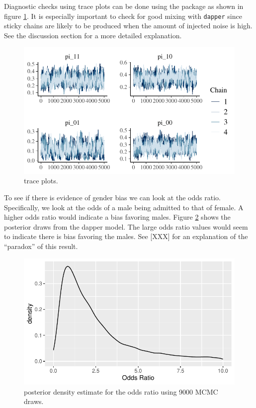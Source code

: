 Diagnostic checks using trace plots can be done using the  package
as shown in figure \ref{fig:trace-plot}. It is especially important to check for good mixing
with \texttt{dapper} since sticky chains are likely to be produced
when the amount of injected noise is high. See the discussion section
for a more detailed explanation.

\begin{figure}

{\centering \includegraphics{dppaper_files/figure-latex/trace-plot-1} 

}

\caption{trace plots.}\label{fig:trace-plot}
\end{figure}

To see if there is evidence of gender bias we can look at the odds ratio.
Specifically, we look at the odds of a male being admitted to
that of female. A higher odds ratio would indicate a bias
favoring males. Figure \ref{fig:post-or-density} shows the posterior draws
from the dapper model. The large odds ratio values would seem
to indicate there is bias favoring the males. See {[}XXX{]} for
an explanation of the ``paradox'' of this result.

\begin{figure}

{\centering \includegraphics{dppaper_files/figure-latex/post-or-density-1} 

}

\caption{posterior density estimate for the odds ratio using 9000 MCMC draws.}\label{fig:post-or-density}
\end{figure}

